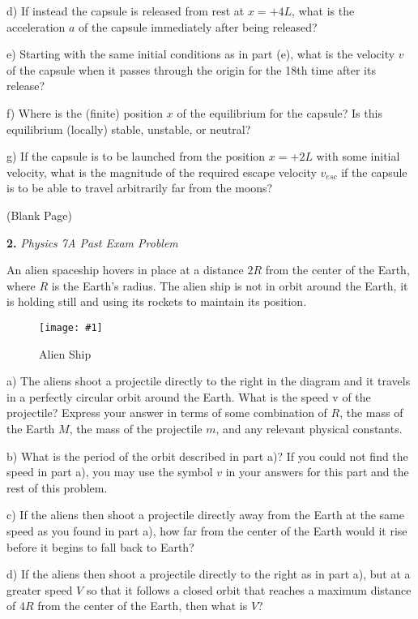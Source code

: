\documentclass[11pt]{article}
\newcommand{\fig}[4]{
    \begin{figure}[H]
        \centering
        \texttt{[image: \#1]}
        \caption{#2}
        \label{exp4fit}
    \end{figure}
}
\theoremstyle{gangnamstyle}{\newtheorem{definition}{Definition}[]}
\theoremstyle{gangnamstyle}{\newtheorem{example}{Example}[]}
\theoremstyle{gangnamstyle}{\newtheorem{problem}{Problem}[]}
\begin{document}
d) If instead the capsule is released from rest at $x = +4L$, what is the acceleration $a$ of the capsule immediately after being released?

\pagebreak

e) Starting with the same initial conditions as in part (e), what is the velocity $v$ of the capsule when it passes through the origin for the 18th time after its release?

f) Where is the (finite) position $x$ of the equilibrium for the capsule? Is this equilibrium (locally) stable, unstable, or neutral?

g) If the capsule is to be launched from the position $x = +2L$ with some initial velocity, what is the magnitude of the required escape velocity $v_{esc}$ if the capsule is to be able to travel arbitrarily far from the moons?

\pagebreak

\begin{center}
(Blank Page)
\end{center}

\pagebreak

\textbf{2.} \textit{Physics 7A Past Exam Problem}

An alien spaceship hovers in place at a distance $2R$ from the center of the Earth, where $R$ is the Earth’s radius. The alien ship is not in orbit around the Earth, it is holding still and using its rockets to maintain its position.

\fig{figs/mt2/deweese3.png}{Alien Ship}{0.65}{0}

a) The aliens shoot a projectile directly to the right in the diagram and it travels in a perfectly circular orbit around the Earth. What is the speed v of the projectile? Express your answer in terms of some combination of $R$, the mass of the Earth $M$, the mass of the projectile $m$, and any relevant physical constants.

b) What is the period of the orbit described in part a)? If you could not find the speed in part a), you may use the symbol $v$ in your answers for this part and the rest of this problem.

c) If the aliens then shoot a projectile directly away from the Earth at the same speed as you found in part a), how far from the center of the Earth would it rise before it begins to fall back to Earth?

d) If the aliens then shoot a projectile directly to the right as in part a), but at a greater speed $V$ so that it follows a closed orbit that reaches a maximum distance of $4R$ from the center of the Earth, then what is $V$?
\end{document}
